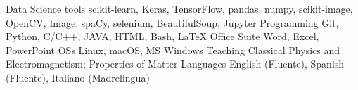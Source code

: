 

\begin{cvskills}
  \cvskill
    {Data Science tools}
    {scikit-learn, Keras, TensorFlow, pandas, numpy, scikit-image, OpenCV, Image, spaCy, selenium, BeautifulSoup, Jupyter}
  \cvskill
    {Programming} %
    {Git, Python, C/C++, JAVA, HTML, Bash, LaTeX} %
  \cvskill
    {Office Suite}
    {Word, Excel, PowerPoint}
  \cvskill
    {OSs}
    {Linux, macOS, MS Windows}
  \cvskill
    {Teaching}
    {Classical Physics and Electromagnetism; Properties of Matter}
  \cvskill
    {Languages} %
    {English (Fluente), Spanish (Fluente), Italiano (Madrelingua)} %
\end{cvskills}
